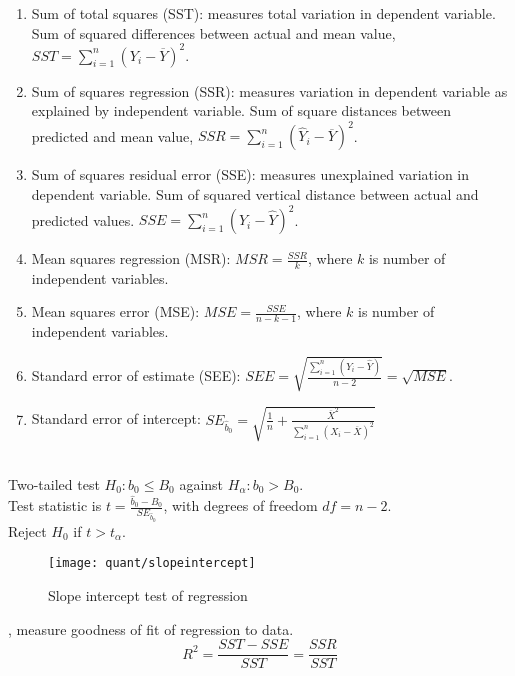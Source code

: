 \begin{definition} 
\begin{enumerate}[label=\roman*.]
\setlength{\itemsep}{0pt}
\item Sum of total squares (SST): measures total variation in dependent variable. Sum of squared differences between actual and mean value, $SST = \sum\limits_{i=1}^n (Y_i - \overline{Y})^2$.
\item Sum of squares regression (SSR): measures variation in dependent variable as explained by independent variable. Sum of square distances between predicted and mean value, $SSR = \sum\limits_{i=1}^n (\hat{Y}_i - \overline{Y})^2$.
\item Sum of squares residual error (SSE): measures unexplained variation in dependent variable. Sum of squared vertical distance between actual and predicted values. $SSE = \sum\limits_{i=1}^n (Y_i - \hat{Y})^2$.
\item Mean squares regression (MSR): $MSR = \frac{SSR}{k}$, where $k$ is number of independent variables.
\item Mean squares error (MSE): $MSE = \frac{SSE}{n-k-1}$, where $k$ is number of independent variables.
\item Standard error of estimate (SEE): $SEE = \sqrt{\frac{\sum\limits_{i=1}^n (Y_i - \hat{Y})}{n-2}} = \sqrt{MSE}$.
\item Standard error of intercept: $SE_{\hat{b}_0} = \sqrt{\frac{1}{n} + \frac{\overline{X}^2}{\sum\limits_{i=1}^n(X_i - \overline{X})^2}}$
\end{enumerate}
\end{definition}

\begin{definition} \\
Two-tailed test $H_0: b_0 \leq B_0$ against $H_{\alpha} : b_0 > B_0$.\\
Test statistic is $t = \frac{\hat{b}_0 - B_0}{SE_{\hat{b}_0}}$, with degrees of freedom $df = n-2$.\\
Reject $H_0$ if $t > t_{\alpha}$.
\end{definition}

\begin{figure}[H]
\centering
\texttt{[image: quant/slopeintercept]}
\caption{Slope intercept test of regression}
\end{figure}

\begin{definition} , measure goodness of fit of regression to data.
\begin{equation}
R^2 = \frac{SST - SSE}{SST} = \frac{SSR}{SST} \nonumber
\end{equation}
\end{definition}

